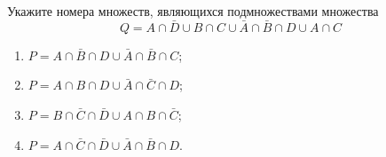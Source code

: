 \question
Укажите номера множеств, являющихся подмножествами множества
\begin{equation*}
	Q = A \cap \bar{D} \cup B \cap C \cup \bar{A} \cap \bar{B} \cap D \cup A \cap C
\end{equation*}

\begin{enumerate}
	\renewcommand{\labelenumi}{\arabic{enumi})}
	\item $P = A \cap \bar{B} \cap D \cup \bar{A} \cap \bar{B} \cap C$;
	\item $P = A \cap B \cap D \cup \bar{A} \cap \bar{C} \cap D$;
	\item $P = B \cap \bar{C} \cap \bar{D} \cup A \cap B \cap \bar{C}$;
	\item $P = A \cap \bar{C} \cap \bar{D} \cup \bar{A} \cap \bar{B} \cap D$.
\end{enumerate}
